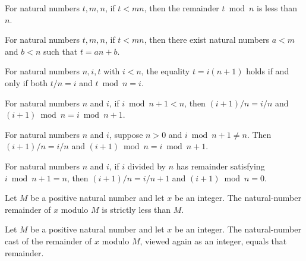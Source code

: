 \begin{theorem}
\label{Nat.mod_lt_of_lt_mul}
\leanok
{}
For natural numbers $t,m,n$, if $t<mn$, then the remainder $t\bmod n$ is less than $n$.
\end{theorem}

\begin{theorem}
\label{Nat.exists_eq_mul_add_of_lt_mul}
\leanok
{}
For natural numbers $t,m,n$, if $t<mn$, then there exist natural numbers $a<m$ and $b<n$
such that $t=an+b$.
\end{theorem}

\begin{theorem}
\label{Nat.eq_mul_succ_iff}
\leanok
{}
For natural numbers $n,i,t$ with $i<n$, the equality $t=i(n+1)$ holds if and only if
both $t/n=i$ and $t\bmod n=i$.
\end{theorem}

\begin{theorem}
\label{Nat.succ_div_mod_of_lt}
\leanok
{}
For natural numbers $n$ and $i$, if $i\bmod n+1<n$, then $(i+1)/n=i/n$ and $(i+1)\bmod
n=i\bmod n+1$.
\end{theorem}

\begin{theorem}
\label{Nat.succ_div_mod_of_ne}
\leanok
{}
For natural numbers $n$ and $i$, suppose $n>0$ and $i\bmod n+1\ne n$. Then $(i+1)/n=i/n$
and $(i+1)\bmod n=i\bmod n+1$.
\end{theorem}

\begin{theorem}
\label{Nat.succ_div_mod_of_eq}
\leanok
{}
For natural numbers $n$ and $i$, if $i$ divided by $n$ has remainder satisfying $i\bmod
n+1=n$, then $(i+1)/n=i/n+1$ and $(i+1)\bmod n=0$.
\end{theorem}

\begin{theorem}
\label{Int.toNat_emod_lt}
\leanok
{}
Let $M$ be a positive natural number and let $x$ be an integer. The natural-number
remainder of $x$ modulo $M$ is strictly less than $M$.
\end{theorem}

\begin{theorem}
\label{Int.natCast_toNat_emod}
\leanok
{}
Let $M$ be a positive natural number and let $x$ be an integer. The natural-number cast
of the remainder of $x$ modulo $M$, viewed again as an integer, equals that remainder.
\end{theorem}
